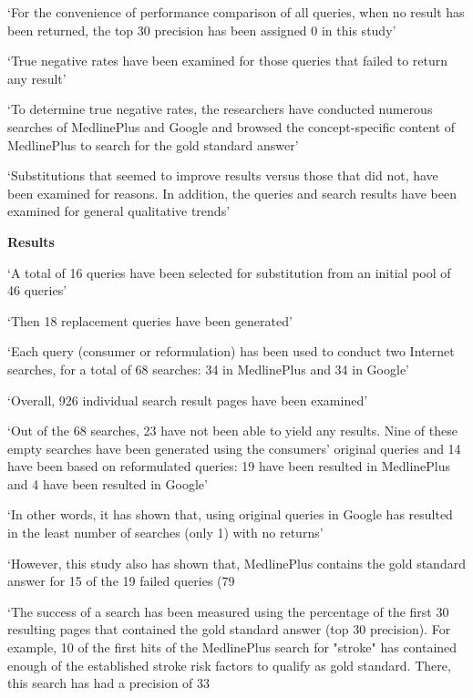 \documentclass[]{article}
\begin{document}
{{{‘For the convenience of performance comparison of all queries, when no result has been returned, the top 30 precision has been assigned 0 in this study’

‘True negative rates have been examined for those queries that failed to return any result’

‘To determine true negative rates, the researchers have conducted numerous searches of MedlinePlus and Google and browsed the concept-specific content of MedlinePlus to search for the gold standard answer’

‘Substitutions that seemed to improve results versus those that did not, have been examined for reasons. In addition, the queries and search results have been examined for general qualitative trends’

\textbf{Results}

‘A total of 16 queries have been selected for substitution from an initial pool of 46 queries’

‘Then 18 replacement queries have been generated’

‘Each query (consumer or reformulation) has been used to conduct two Internet searches, for a total of 68 searches: 34 in MedlinePlus and 34 in Google’

‘Overall, 926 individual search result pages have been examined’

‘Out of the 68 searches, 23 have not been able to yield any results. Nine of these empty searches have been generated using the consumers' original queries and 14 have been based on reformulated queries: 19 have been resulted in MedlinePlus and 4 have been resulted in Google’

‘In other words, it has shown that, using original queries in Google has resulted in the least number of searches (only 1) with no returns’

‘However, this study also has shown that, MedlinePlus contains the gold standard answer for 15 of the 19 failed queries (79%

‘The success of a search has been measured using the percentage of the first 30 resulting pages that contained the gold standard answer (top 30 precision). For example, 10 of the first hits of the MedlinePlus search for "stroke" has contained enough of the established stroke risk factors to qualify as gold standard. There, this search has had a precision of 33%

}}}
\end{document}
